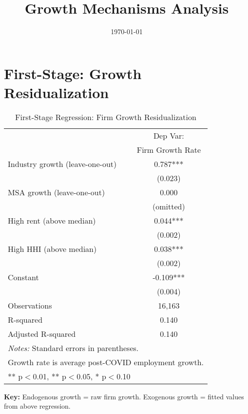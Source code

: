 \documentclass[11pt]{article}
\title{Growth Mechanisms Analysis}
\date{\today}
\begin{document}
\maketitle

\section{First-Stage: Growth Residualization}

\begin{table}[htbp]
\centering
\caption{First-Stage Regression: Firm Growth Residualization}
\begin{tabular}{lc}
\toprule
 & Dep Var: \\
 & Firm Growth Rate \\
\midrule
Industry growth (leave-one-out) & 0.787*** \\
                               & (0.023) \\
MSA growth (leave-one-out)     & 0.000 \\
                               & (omitted) \\
High rent (above median)       & 0.044*** \\
                               & (0.002) \\
High HHI (above median)        & 0.038*** \\
                               & (0.002) \\
Constant                       & -0.109*** \\
                               & (0.004) \\
\midrule
Observations                   & 16,163 \\
R-squared                      & 0.140 \\
Adjusted R-squared             & 0.140 \\
\bottomrule
\multicolumn{2}{l}{\footnotesize \textit{Notes:} Standard errors in parentheses.} \\
\multicolumn{2}{l}{\footnotesize Growth rate is average post-COVID employment growth.} \\
\multicolumn{2}{l}{\footnotesize *** p$<$0.01, ** p$<$0.05, * p$<$0.10} \\
\end{tabular}
\end{table}

\textbf{Key:} Endogenous growth = raw firm growth. Exogenous growth = fitted values from above regression.
\end{document}
